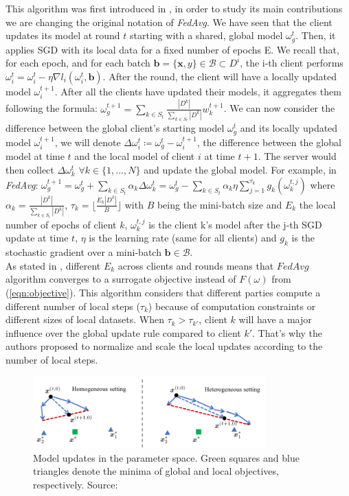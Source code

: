 This algorithm was first introduced in \cite*{wang2020}, in order to study its main contributions we are changing the original notation of \textit{FedAvg}. We have seen that the client updates its model at round $t$ starting with a shared, global model $\omega_g^t$. Then, it applies SGD with its local data for a fixed number of epochs E.
We recall that, for each epoch, and for each batch $\mathbf{b} = \{\mathbf{x}, y\} \in \mathcal{B} \subset D^i$, the i-th client performs $\omega_i^t = \omega_i^t - \eta \nabla l_i(\omega_i^t, \mathbf{b})$. After the round, the client will have a locally updated model $\omega_i^{t+1}$. After all the clients have updated their models, it aggregates them following the formula: $\omega_g^{t+1} = \sum_{k \in S_t} \frac{|D^k|}{\sum_{k\in S_t} |D^k|} w_k^{t+1}$.
We can now consider the difference between the global client's starting model $\omega_g^t$ and its locally updated model $\omega_i^{t+1}$, we will denote $\Delta \omega_i^t \coloneqq \omega_g^t - \omega_i^{t+1}$, the difference between the global model at time $t$ and the local model of client $i$ at time $t+1$.
The server would then collect $\Delta \omega_k^t$ $\forall k \in \{1,\dots, N\}$ and update the global model. For example, in \textit{FedAvg}: $\omega_g^{t+1} = \omega_g^t + \sum_{k \in S_t} \alpha_k \Delta \omega_k^t = \omega_g^t - \sum_{k \in S_t} \alpha_k \eta \sum_{j=1}^{\tau_k} g_k(\omega_k^{t, j})$ where $\alpha_k = \frac{|D^k|}{\sum_{k\in S_t} |D^k|}$, $\tau_k = \lfloor \frac{E_k |D^k|}{B} \rfloor$ with $B$ being the mini-batch size and $E_k$ the local number of epochs of client $k$, $\omega_k^{t,j}$ is the client k's model after the j-th SGD update at time $t$, $\eta$ is the learning rate (same for all clients) and $g_k$ is the stochastic gradient over a mini-batch $\mathbf{b} \in \mathcal{B}$.\\
As stated in \cite*{wang2020}, different $E_k$ across clients and rounds means that $FedAvg$ algorithm converges to a surrogate objective instead of $F(\omega)$ from (\ref{eqn:objective}).
This algorithm considers that different parties compute a different number of local steps ($\tau_k$) because of computation constraints or different sizes of local datasets. When $\tau_{k} > \tau_{k'}$, client $k$ will have a major influence over the global update rule compared to client $k'$. That's why the authors proposed to normalize and scale the local updates according to the number of local steps.

\begin{figure}[H]
  \centering
  \includegraphics[width=0.8\textwidth]{figures/2-Federated_Learning/FedNova_Normalization_model_drift.png}
  \caption{Model updates in the parameter space. Green squares and blue triangles denote the minima of global and local objectives, respectively. Source: \cite{wang2020}}
  \label{fig:FedNova_Normalization_model_drif}
\end{figure}

